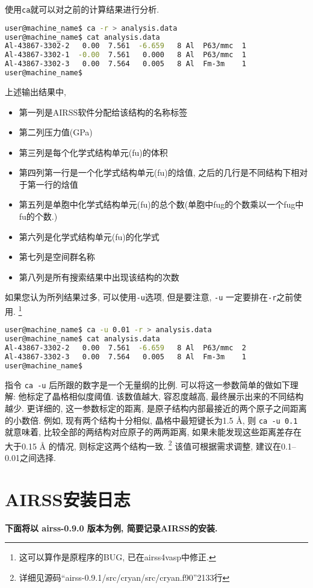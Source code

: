 \documentclass[a4paper, 10pt]{article}
\begin{document}
使用\verb|ca|就可以对之前的计算结果进行分析.
\begin{lstlisting}[language={bash}]
user@machine_name$ ca -r > analysis.data
user@machine_name$ cat analysis.data
Al-43867-3302-2   0.00  7.561  -6.659   8 Al  P63/mmc  1
Al-43867-3302-1  -0.00  7.561   0.000   8 Al  P63/mmc  1
Al-43867-3302-3   0.00  7.564   0.005   8 Al  Fm-3m    1
user@machine_name$
\end{lstlisting}

上述输出结果中, 
\begin{itemize}
  \item 第一列是AIRSS软件分配给该结构的名称标签
  \item 第二列压力值(GPa)
  \item 第三列是每个化学式结构单元(fu)的体积
  \item 第四列第一行是一个化学式结构单元(fu)的焓值, 之后的几行是不同结构下相对于第一行的焓值
  \item 第五列是单胞中化学式结构单元(fu)的总个数(单胞中fug的个数乘以一个fug中fu的个数.)
  \item 第六列是化学式结构单元(fu)的化学式
  \item 第七列是空间群名称
  \item 第八列是所有搜索结果中出现该结构的次数
\end{itemize}

如果您认为所列结果过多, 可以使用\verb|-u|选项, 但是要注意, \verb|-u| 一定要排在\verb|-r|之前使用. \footnote{这可以算作是原程序的BUG, 已在airss4vasp中修正.}
\begin{lstlisting}[language={bash}]
user@machine_name$ ca -u 0.01 -r > analysis.data
user@machine_name$ cat analysis.data
Al-43867-3302-2   0.00  7.561  -6.659   8 Al  P63/mmc  2
Al-43867-3302-3   0.00  7.564   0.005   8 Al  Fm-3m    1
user@machine_name$
\end{lstlisting}

指令 \verb|ca -u| 后所跟的数字是一个无量纲的比例. 可以将这一参数简单的做如下理解:  他标定了晶格相似度阈值. 该数值越大, 容忍度越高, 最终展示出来的不同结构越少. 更详细的, 这一参数标定的距离, 是原子结构内部最接近的两个原子之间距离的小数倍. 例如, 现有两个结构十分相似, 晶格中最短键长为1.5 \r{A}, 则 \verb|ca -u 0.1| 就意味着, 比较全部的两结构对应原子的两两距离, 如果未能发现这些距离差存在大于0.15 \r{A} 的情况, 则标定这两个结构一致. \footnote{详细见源码``airss-0.9.1/src/cryan/src/cryan.f90''2133行} 该值可根据需求调整, 建议在0.1--0.01之间选择.

\newpage
\appendix
\section{AIRSS安装日志}
\textbf{下面将以 airss-0.9.0 版本为例, 简要记录AIRSS的安装.}
\end{document}
